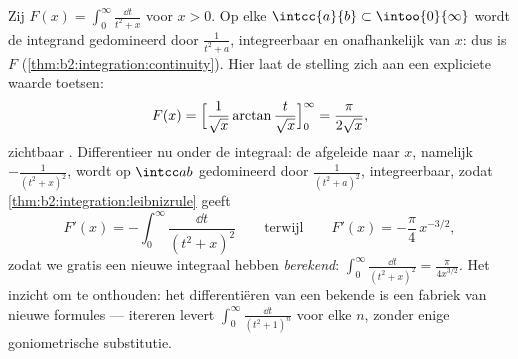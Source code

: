 \begin{example}\label{ex:b2:integration:arctanparam}
Zij $F(x) = \displaystyle\int_0^\infty \frac{\dd t}{t^2 + x}$ voor
$x > 0$. Op elke $\intcc{a}{b} \subset \intoo{0}{\infty}$ wordt de
integrand gedomineerd door $\frac{1}{t^2 + a}$, integreerbaar en
onafhankelijk van $x$: dus is $F$ 
(\cref{thm:b2:integration:continuity}). Hier laat de stelling zich
aan een expliciete waarde toetsen:
\[
F(x) = \Bigl[\frac{1}{\sqrt x}\arctan\frac{t}{\sqrt
x}\Bigr]_0^\infty = \frac{\pi}{2\sqrt x} ,
\]
zichtbaar . Differentieer nu onder de integraal: de
afgeleide naar $x$, namelijk $-\frac{1}{(t^2+x)^2}$, wordt op
$\intcc ab$ gedomineerd door $\frac{1}{(t^2+a)^2}$, integreerbaar,
zodat \cref{thm:b2:integration:leibnizrule} geeft
\[
F'(x) = -\int_0^\infty \frac{\dd t}{(t^2 + x)^2}
\qquad\text{terwijl}\qquad
F'(x) = -\frac{\pi}{4}\,x^{-3/2} ,
\]
zodat we gratis een nieuwe integraal hebben \emph{berekend}:
$\int_0^\infty\frac{\dd t}{(t^2+x)^2} = \frac{\pi}{4x^{3/2}}$. Het
inzicht om te onthouden: het differentiëren van een bekende
 is een fabriek van nieuwe formules --- itereren
levert $\int_0^\infty\frac{\dd t}{(t^2+1)^n}$ voor elke $n$, zonder
enige goniometrische substitutie.
\end{example}

